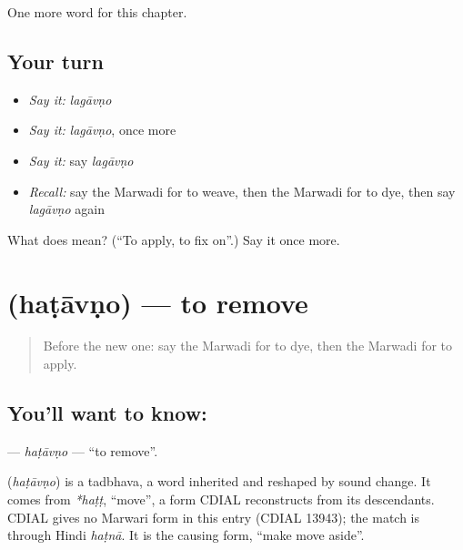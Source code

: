 \begin{grammarlens}[title={What you've built}]
One more word for this chapter.
\end{grammarlens}

\subsection*{Your turn}
\begin{itemize}
\raggedright
  \item \emph{Say it:} \emph{lagāvṇo}
  \item \emph{Say it:} \emph{lagāvṇo}, once more
  \item \emph{Say it:} say \emph{lagāvṇo}
  \item \emph{Recall:} say the Marwadi for to weave, then the Marwadi for to dye, then say \emph{lagāvṇo} again
\end{itemize}

\begin{tcolorbox}[breakable,colback=teal!4,colframe=teal!35!black,title={Before you move on}]
What does  mean? (\textquotedblleft{}To apply, to fix on\textquotedblright{}.) Say it once more.
\end{tcolorbox}
\section[\texorpdfstring{\mw{हटावणो} (haṭāvṇo)}{हटावणो (haṭāvṇo)}]{ (haṭāvṇo) — to remove}

\label{lesson:MW-C107-hatavno}



\begin{quote}
Before the new one: say the Marwadi for to dye, then the Marwadi for to apply.
\end{quote}

\subsection*{You'll want to know: }
\textbf{} — \emph{haṭāvṇo} — \textquotedblleft{}to remove\textquotedblright{}.

\begin{cousinweb}
\textbf{} (\emph{haṭāvṇo}) is a tadbhava, a word inherited and reshaped by sound change. It comes from \emph{*haṭṭ}, \textquotedblleft{}move\textquotedblright{}, a form CDIAL reconstructs from its descendants. CDIAL gives no Marwari form in this entry (CDIAL 13943); the match is through Hindi \emph{haṭnā}. It is the causing form, \textquotedblleft{}make move aside\textquotedblright{}.
\end{cousinweb}

